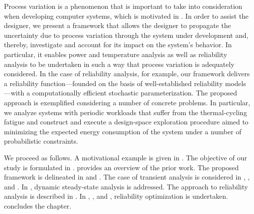 Process variation is a phenomenon that is important to take into consideration
when developing computer systems, which is motivated in
. In order to assist the designer, we present a
framework that allows the designer to propagate the uncertainty due to process
variation through the system under development and, thereby, investigate and
account for its impact on the system's behavior. In particular, it enables power
and temperature analysis as well as reliability analysis to be undertaken in
such a way that process variation is adequately considered. In the case of
reliability analysis, for example, our framework delivers a reliability
function---founded on the basis of well-established reliability models---with a
computationally efficient stochastic parameterization. The proposed approach is
exemplified considering a number of concrete problems. In particular, we analyze
systems with periodic workloads that suffer from the thermal-cycling fatigue and
construct and execute a design-space exploration procedure aimed to minimizing
the expected energy consumption of the system under a number of probabilistic
constraints.

We proceed as follows. A motivational example is given in
. The objective of our study is formulated in
.  provides an overview of the prior work.
The proposed framework is delineated in  and
. The case of transient analysis is considered
in , , and
. In ,
dynamic steady-state analysis is addressed. The approach to reliability analysis
is described in . In
, , and
, reliability optimization is undertaken.
 concludes the chapter.

